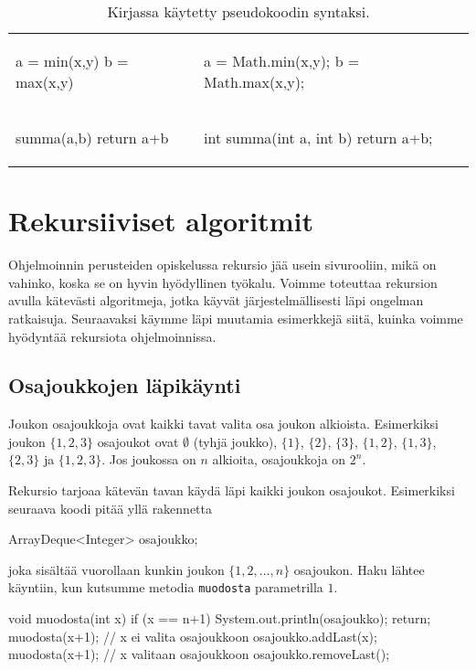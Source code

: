 \begin{table}
\begin{tabular}{ll}
\begin{smallcode}[xleftmargin=0pt]
a = min(x,y)
b = max(x,y)
\end{smallcode}
&
\begin{smallcode}
a = Math.min(x,y);
b = Math.max(x,y);
\end{smallcode}
\\
\begin{smallcode}[xleftmargin=0pt]
summa(a,b)
    return a+b
\end{smallcode}
&
\begin{smallcode}
int summa(int a, int b) {
    return a+b;
}
\end{smallcode}
\\
\end{tabular}
\caption{Kirjassa käytetty pseudokoodin syntaksi.}
\label{tab:psekoo}
\end{table}

\section{Rekursiiviset algoritmit}

Ohjelmoinnin perusteiden opiskelussa rekursio jää usein sivurooliin,
mikä on vahinko, koska se on hyvin hyödyllinen työkalu.
Voimme toteuttaa rekursion avulla kätevästi algoritmeja,
jotka käyvät järjestelmällisesti läpi ongelman ratkaisuja.
Seuraavaksi käymme läpi muutamia esimerkkejä siitä,
kuinka voimme hyödyntää rekursiota ohjelmoinnissa.

\subsection{Osajoukkojen läpikäynti}

Joukon osajoukkoja ovat kaikki tavat valita osa joukon alkioista.
Esimerkiksi joukon $\{1,2,3\}$ osajoukot ovat
$\emptyset$ (tyhjä joukko), $\{1\}$, $\{2\}$, $\{3\}$,
$\{1,2\}$, $\{1,3\}$, $\{2,3\}$ ja $\{1,2,3\}$.
Jos joukossa on $n$ alkioita, osajoukkoja on $2^n$.

Rekursio tarjoaa kätevän tavan käydä läpi kaikki
joukon osajoukot. Esimerkiksi seuraava koodi pitää yllä
rakennetta

\begin{code}
ArrayDeque<Integer> osajoukko;
\end{code}

joka sisältää vuorollaan kunkin joukon $\{1,2,\dots,n\}$
osajoukon.
Haku läh\-tee käyntiin, kun kutsumme metodia \texttt{muodosta}
parametrilla $1$.

\begin{code}
void muodosta(int x) {
    if (x == n+1) {
        System.out.println(osajoukko);
        return;
    }
    muodosta(x+1); // x ei valita osajoukkoon
    osajoukko.addLast(x);
    muodosta(x+1); // x valitaan osajoukkoon
    osajoukko.removeLast();
}
\end{code}

